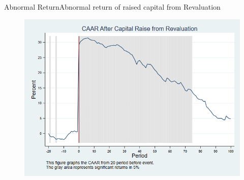 \documentclass{beamer}
\begin{document}
%





\begin{frame}{Abnormal Return}{Abnormal return of raised capital from Revaluation}
\label{abreturnrevalution}
\begin{figure}
\centering
\includegraphics[width=0.65\linewidth]{AbReturnRevalution}
\label{fig:abreturnrevalution}
\end{figure}

\hfill\hyperlink{abreturnrevalution4Factor}{}
\end{frame}
\end{document}
